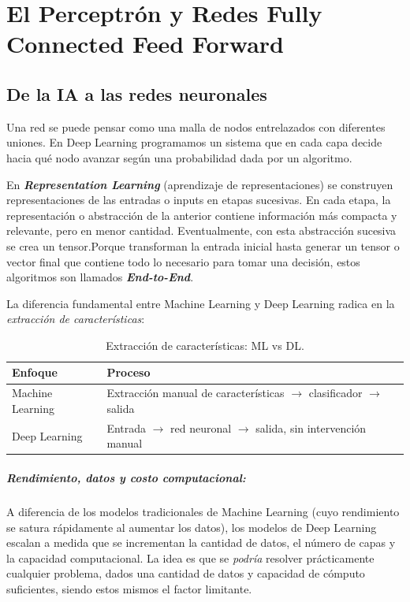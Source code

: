 ﻿%
\cleardoublepage
\chapter{El Perceptrón y Redes Fully Connected Feed Forward}

\section{De la IA a las redes neuronales}

Una red se puede pensar como una malla de nodos entrelazados con diferentes uniones. En Deep Learning programamos un sistema que en cada capa decide hacia qué nodo avanzar según una probabilidad dada por un algoritmo.

En \textbf{\emph{Representation Learning}} (aprendizaje de representaciones) se construyen representaciones de las entradas o inputs en etapas sucesivas. En cada etapa, la representación o abstracción de la anterior contiene información más compacta y relevante, pero en menor cantidad. Eventualmente, con esta abstracción sucesiva se crea un tensor.Porque transforman la entrada inicial hasta generar un tensor o vector final que contiene todo lo necesario para tomar una decisión, estos algoritmos son llamados \textbf{\emph{End-to-End}}.

La diferencia fundamental entre Machine Learning y Deep Learning radica en la \emph{extracción de características}:

\begin{table}[H]
\centering
\caption{Extracción de características: ML vs DL.}
\label{tab:representacion}
\small
\begin{tabular}{@{}ll@{}}
\toprule
\textbf{Enfoque} & \textbf{Proceso} \\
\midrule
Machine Learning & Extracción manual de características $\to$ clasificador $\to$ salida \\
Deep Learning & Entrada $\to$ red neuronal $\to$ salida, sin intervención manual \\
\bottomrule
\end{tabular}
\end{table}

\paragraph{Rendimiento, datos y costo computacional:}
A diferencia de los modelos tradicionales de Machine Learning (cuyo rendimiento se satura rápidamente al aumentar los datos), los modelos de Deep Learning escalan a medida que se incrementan la cantidad de datos, el número de capas y la capacidad computacional.
La idea es que se \emph{podría} resolver prácticamente cualquier problema, dados una cantidad de datos y capacidad de cómputo suficientes, siendo estos mismos el factor limitante.

